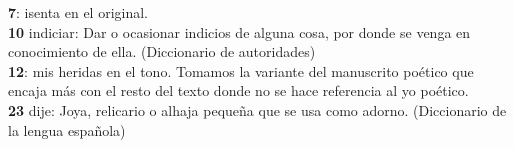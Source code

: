 \noindent \textbf{7}: isenta en el original. \\
\textbf{10} indiciar: Dar o ocasionar indicios de alguna cosa, por donde se venga en conocimiento de ella. (Diccionario de autoridades)\\
\textbf{12}: mis heridas en el tono. Tomamos la variante del manuscrito poético que encaja más con el resto del texto donde no se hace referencia al yo poético.\\
\textbf{23} dije: Joya, relicario o alhaja pequeña que se usa como adorno. (Diccionario de la lengua española)


